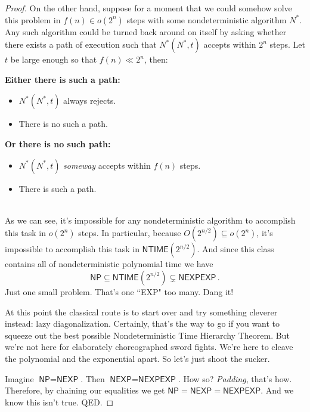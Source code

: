 \documentclass{article}
\newcommand{\nameditem}[1]{\item\textbf{#1}}
\newcommand{\impl}{\item[$\Rightarrow$]}
\newcommand{\NTIME}{\ensuremath{\textsf{NTIME}}}
\newcommand{\NP}{\ensuremath{\textsf{NP}}}
\newcommand{\NEXP}{\ensuremath{\textsf{NEXP}}}
\newcommand{\NEXPEXP}{\ensuremath{\textsf{NEXPEXP}}}
\begin{document}
\begin{proof}
On the other hand, suppose for a moment that we could somehow solve this problem in $f(n) \in o(2^n)$ steps with some nondeterministic algorithm $N^*$. Any such algorithm could be turned back around on itself by asking whether there exists a path of execution such that $N^*(N^*, t)$ accepts within $2^n$ steps. Let $t$ be large enough so that $f(n) \ll 2^n$, then:\\[0.5em]
\begin{minipage}{0.35\textwidth}
\begin{description}[noitemsep]
\nameditem{Either there is such a path:} 
\begin{itemize}[noitemsep]
\impl $N^*(N^*, t)$ always rejects.
\impl There is no such a path. \lightning
\end{itemize}
\end{description}
\end{minipage}
\begin{minipage}{0.5\textwidth}
\begin{description}[noitemsep]
\nameditem{Or there is no such path:} 
\begin{itemize}[noitemsep]
\impl $N^*(N^*, t)$ \textit{someway} accepts within $f(n)$ steps.
\impl There is such a path. \lightning
\end{itemize}
\end{description}
\end{minipage}\\[1em]
As we can see, it's impossible for any nondeterministic algorithm to accomplish this task in $o(2^n)$ steps. In particular, because $O\left(2^{n/2}\right) \subseteq o(2^n)$, it's impossible to accomplish this task in $\NTIME\left(2^{n/2}\right)$. And since this class contains all of nondeterministic polynomial time we have
\[
\NP \subseteq \NTIME\left(2^{n/2}\right) \subsetneq \NEXPEXP\,.
\]
Just one small problem. That's one ``\textsf{EXP}" too many. Dang it!

At this point the classical route is to start over and try something cleverer instead: lazy diagonalization.\cite{stanislav} Certainly, that's the way to go if you want to squeeze out the best possible Nondeterministic Time Hierarchy Theorem. But we're not here for elaborately choreographed sword fights. We're here to cleave the polynomial and the exponential apart. So let's just shoot the sucker.

Imagine $\NP = \NEXP$. Then $\NEXP = \NEXPEXP$. How so? \textit{Padding}, that's how. Therefore, by chaining our equalities we get $\NP = \NEXP = \NEXPEXP$. And we know this isn't true. QED.


\end{proof}
\end{document}
